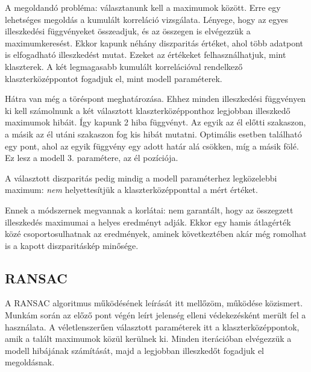 A megoldandó probléma: választanunk kell a maximumok között.
Erre egy lehetséges megoldás a kumulált korreláció vizsgálata.
Lényege, hogy az egyes illeszkedési függvényeket összeadjuk, és az összegen is elvégezzük a maximumkeresést.
Ekkor kapunk néhány diszparitás értéket, ahol több adatpont is elfogadható illeszkedést mutat.
Ezeket az értékeket felhasználhatjuk, mint klaszterek.
A két legmagasabb kumulált korrelációval rendelkező klaszterközéppontot fogadjuk el, mint modell paraméterek.

Hátra van még a töréspont meghatározása.
Ehhez minden illeszkedési függvényen ki kell számolnunk a két választott klaszterközépponthoz legjobban illeszkedő maximumok hibáit.
Így kapunk 2 hiba függvényt.
Az egyik az él előtti szakaszon, a másik az él utáni szakaszon fog kis hibát mutatni.
Optimális esetben található egy pont, ahol az egyik függvény egy adott határ alá csökken, míg a másik fölé.
Ez lesz a modell 3. paramétere, az él pozíciója.

A választott diszparitás pedig mindig a modell paraméterhez legközelebbi maximum: \emph{nem} helyettesítjük a klaszterközépponttal a mért értéket.

Ennek a módszernek megvannak a korlátai: nem garantált, hogy az összegzett illeszkedés maximumai a helyes eredményt adják.
Ekkor egy hamis átlagérték közé csoportosulhatnak az eredmények, aminek következtében akár még romolhat is a kapott diszparitáskép minősége.

\subsection{RANSAC}\label{sect:ransac}

A RANSAC algoritmus működésének leírását itt mellőzöm, működése közismert.
Munkám során az előző pont végén leírt jelenség elleni védekezésként merült fel a használata.
A véletlenszerűen választott paraméterek itt a klaszterközéppontok, amik a talált maximumok közül kerülnek ki.
Minden iterációban elvégezzük a modell hibájának számítását, majd a legjobban illeszkedőt fogadjuk el megoldásnak.